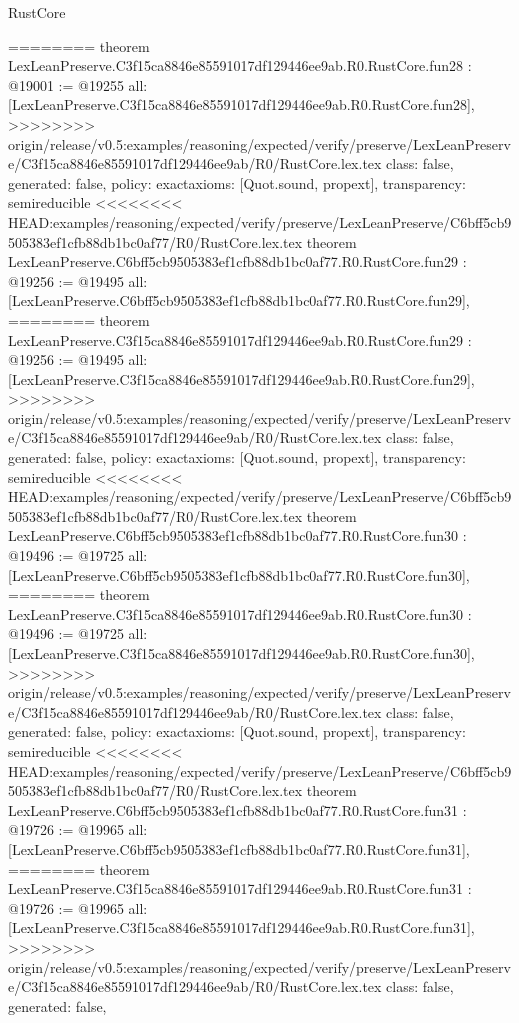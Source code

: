 \begin{lexlean}{RustCore}
\begin{coremodule}
{\begin{coremodule}
{{{{{{{{{{{{{{{{{{{{{{{{{{{{{{{========
theorem LexLeanPreserve.C3f15ca8846e85591017df129446ee9ab.R0.RustCore.fun28 : @19001 := @19255 {
  all: [LexLeanPreserve.C3f15ca8846e85591017df129446ee9ab.R0.RustCore.fun28],
>>>>>>>> origin/release/v0.5:examples/reasoning/expected/verify/preserve/LexLeanPreserve/C3f15ca8846e85591017df129446ee9ab/R0/RustCore.lex.tex
  class: false,
  generated: false,
  policy: exact{axioms: [Quot.sound, propext]},
  transparency: semireducible
}
<<<<<<<< HEAD:examples/reasoning/expected/verify/preserve/LexLeanPreserve/C6bff5cb9505383ef1cfb88db1bc0af77/R0/RustCore.lex.tex
theorem LexLeanPreserve.C6bff5cb9505383ef1cfb88db1bc0af77.R0.RustCore.fun29 : @19256 := @19495 {
  all: [LexLeanPreserve.C6bff5cb9505383ef1cfb88db1bc0af77.R0.RustCore.fun29],
========
theorem LexLeanPreserve.C3f15ca8846e85591017df129446ee9ab.R0.RustCore.fun29 : @19256 := @19495 {
  all: [LexLeanPreserve.C3f15ca8846e85591017df129446ee9ab.R0.RustCore.fun29],
>>>>>>>> origin/release/v0.5:examples/reasoning/expected/verify/preserve/LexLeanPreserve/C3f15ca8846e85591017df129446ee9ab/R0/RustCore.lex.tex
  class: false,
  generated: false,
  policy: exact{axioms: [Quot.sound, propext]},
  transparency: semireducible
}
<<<<<<<< HEAD:examples/reasoning/expected/verify/preserve/LexLeanPreserve/C6bff5cb9505383ef1cfb88db1bc0af77/R0/RustCore.lex.tex
theorem LexLeanPreserve.C6bff5cb9505383ef1cfb88db1bc0af77.R0.RustCore.fun30 : @19496 := @19725 {
  all: [LexLeanPreserve.C6bff5cb9505383ef1cfb88db1bc0af77.R0.RustCore.fun30],
========
theorem LexLeanPreserve.C3f15ca8846e85591017df129446ee9ab.R0.RustCore.fun30 : @19496 := @19725 {
  all: [LexLeanPreserve.C3f15ca8846e85591017df129446ee9ab.R0.RustCore.fun30],
>>>>>>>> origin/release/v0.5:examples/reasoning/expected/verify/preserve/LexLeanPreserve/C3f15ca8846e85591017df129446ee9ab/R0/RustCore.lex.tex
  class: false,
  generated: false,
  policy: exact{axioms: [Quot.sound, propext]},
  transparency: semireducible
}
<<<<<<<< HEAD:examples/reasoning/expected/verify/preserve/LexLeanPreserve/C6bff5cb9505383ef1cfb88db1bc0af77/R0/RustCore.lex.tex
theorem LexLeanPreserve.C6bff5cb9505383ef1cfb88db1bc0af77.R0.RustCore.fun31 : @19726 := @19965 {
  all: [LexLeanPreserve.C6bff5cb9505383ef1cfb88db1bc0af77.R0.RustCore.fun31],
========
theorem LexLeanPreserve.C3f15ca8846e85591017df129446ee9ab.R0.RustCore.fun31 : @19726 := @19965 {
  all: [LexLeanPreserve.C3f15ca8846e85591017df129446ee9ab.R0.RustCore.fun31],
>>>>>>>> origin/release/v0.5:examples/reasoning/expected/verify/preserve/LexLeanPreserve/C3f15ca8846e85591017df129446ee9ab/R0/RustCore.lex.tex
  class: false,
  generated: false,
}}}}}}}}}}}}}}}}}}}}}}}}}}}}}}}}}}}
\end{coremodule}}
\end{coremodule}
\end{lexlean}
